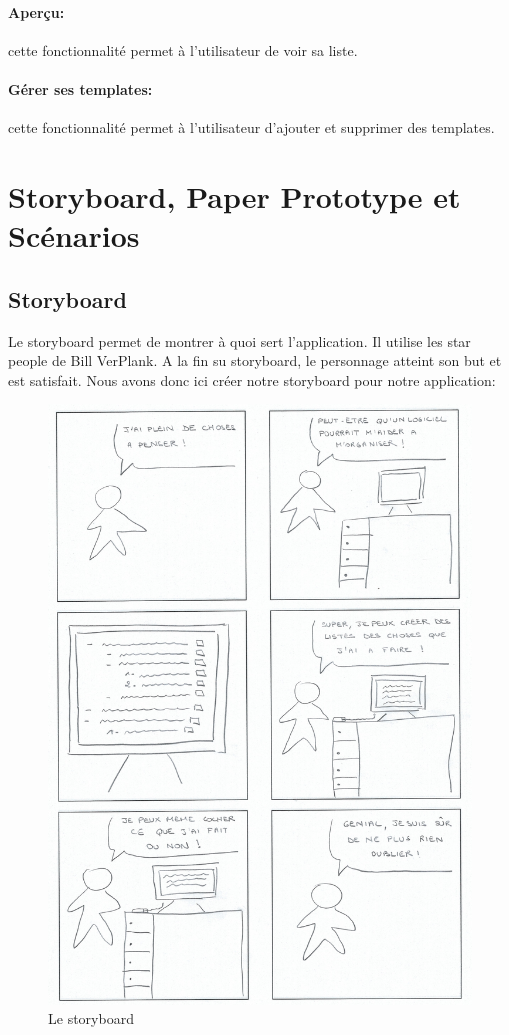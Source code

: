 \documentclass[a4paper,10pt]{article}
\begin{document}
\paragraph{Aperçu:} cette fonctionnalité permet à l'utilisateur de voir sa liste.
\paragraph{Gérer ses templates:} cette fonctionnalité permet à l'utilisateur d'ajouter et supprimer des templates.

\newpage
\section{Storyboard, Paper Prototype et Scénarios}

\subsection{Storyboard}
Le storyboard permet de montrer à quoi sert l'application. Il utilise les star people de Bill VerPlank. A la fin su storyboard, le personnage atteint son but et est satisfait. Nous avons donc ici créer notre storyboard pour notre application:
\begin{figure}[H]
    \center
    \includegraphics[width=13.9cm]{Images/storyboard.png}
    \caption{Le storyboard}
\end{figure}
\end{document}
